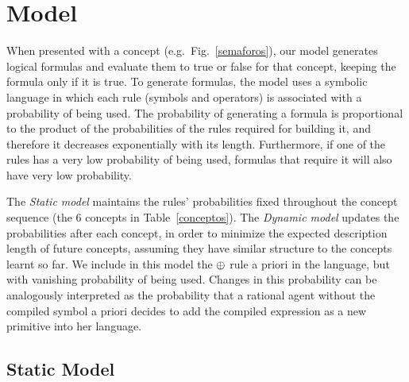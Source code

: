 \section{Model}

When presented with a concept (e.g.~Fig.~\ref{semaforos}), our model generates logical formulas and evaluate them to true or false for that concept, keeping the formula only if it is true. To generate formulas, the model uses a symbolic language in which each rule (symbols and operators) is associated with a probability of being used. The probability of generating a formula is proportional to the product of the probabilities of the rules required for building it, and therefore it decreases exponentially with its length. Furthermore, if one of the rules has a very low probability of being used, formulas that require it will also have very low probability.

The \textit{Static model} maintains the rules' probabilities fixed throughout the concept sequence (the 6 concepts in Table~\ref{conceptos}). The \textit{Dynamic model} updates the probabilities after each concept, in order to minimize the expected description length of future concepts, assuming they have similar structure to the concepts learnt so far. We include in this model the $\oplus$ rule a priori in the language, but with vanishing probability of being used. Changes in this probability can be analogously interpreted as the probability that a rational agent without the compiled symbol a priori decides to add the compiled expression as a new primitive into her language. %


\subsection{Static Model}

